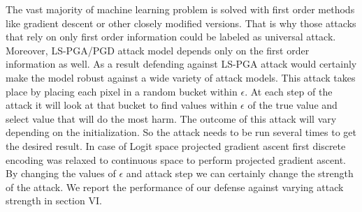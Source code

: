 \documentclass[conference]{IEEEtran}
\begin{document}
The vast majority of machine learning problem is solved with first order  methods like gradient descent or other closely modified versions. That is why those attacks that rely on only first order information could be labeled as universal attack. Moreover, LS-PGA/PGD attack model depends only on the first order information as well. As a result defending against LS-PGA attack would certainly make the model robust against a wide variety of attack models. This attack takes place by placing each pixel in a random bucket within $\epsilon$.
At each step of the attack it will look at that bucket to find values within $\epsilon$ of the true value and select value that will do the most harm. The outcome of this attack will vary depending on the initialization. So the attack needs to be run several times to get the desired result. In case of Logit space projected gradient ascent first discrete encoding was relaxed to continuous space to perform projected gradient ascent. By changing the values of $\epsilon$  and attack step we can certainly change the strength of the attack. We report the performance of our defense against varying attack strength in section VI.
\end{document}
